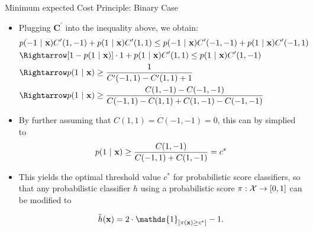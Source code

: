 \documentclass[11pt,compress,t,notes=noshow, xcolor=table]{beamer}
\begin{document}
\begin{vbframe}{Minimum expected Cost Principle: Binary Case}
{\begin{itemize}
			\item Plugging $\mathbf{C}^\prime$ into the inequality above, we obtain:	
			\begin{align*}	
                & p(-1 ~|~ \xv ) C^\prime(1,-1)  + 	p(1 ~|~ \xv ) C^\prime(1,1) \leq  p(-1 ~|~ \xv ) C^\prime(-1,-1)  + 	p(1 ~|~ \xv ) C^\prime(-1,1)  \\ 
                &\Rightarrow [1 - p(1 ~|~ \xv)] \cdot 1 + p(1 ~|~ \xv) C^\prime(1, 1) \leq p(1 ~|~ \xv) C^\prime(1, -1) \\
                &\Rightarrow p(1 ~|~ \xv) \geq \frac{1}{C^\prime(-1, 1) - C^\prime(1, 1) + 1} \\
                &\Rightarrow p(1 ~|~ \xv) \geq \frac{C(1, -1) - C(-1, -1)}{C(-1, 1) - C(1, 1) + C(1, -1) - C(-1, -1)}
			\end{align*}
		
            \item By further assuming that $C(1, 1) = C(-1, -1) = 0 $, this can by simplied to 
            \begin{align*}
                p(1 ~|~ \mathbf{x}) \geq \frac{C(1, -1)}{C(-1, 1) + C(1, -1)} = c^{*}
            \end{align*}	
            
            \item This yields the optimal threshold value $c^*$ for probabilistic score classifiers, so that any probabilistic classifier $h$ using a probabilistic score $\pi:\mathcal{X} \to [0,1]$ can be modified to 
            
            $$   \tilde h(\xv) = 2 \cdot \mathds{1}_{[ \pi(\xv) \geq c^*]} -1. $$
							
		\end{itemize}
	}
\end{vbframe}
\end{document}
